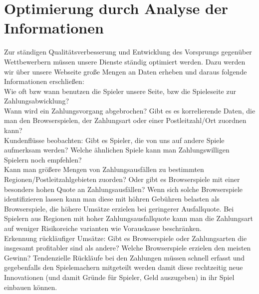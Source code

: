 \documentclass[a4paper,10pt]{article}
\begin{document}
\newpage
\section{Optimierung durch Analyse der Informationen}\label{labelRelDaten}


Zur ständigen Qualitätsverbesserung und Entwicklung des Vorsprungs gegenüber Wettbewerbern müssen unsere Dienste ständig optimiert werden.
Dazu werden wir über unsere Webseite große Mengen an Daten erheben und daraus folgende Informationen erschließen:\\
Wie oft bzw wann benutzen die Spieler unsere Seite, bzw die Spieleseite zur Zahlungsabwicklung?\\
Wann wird ein Zahlungsvorgang abgebrochen? Gibt es es korrelierende Daten, die man den Browserspielen, der Zahlungsart oder einer Postleitzahl/Ort zuordnen kann?\\
Kundenflüsse beobachten: Gibt es Spieler, die von uns auf andere Spiele aufmerksam werden? Welche ähnlichen Spiele kann man Zahlungswilligen Spielern noch empfehlen?\\
Kann man größere Mengen von Zahlungsausfällen zu bestimmten Regionen/Postleitzahlgebieten zuorden? Oder gibt es Browserspiele mit einer besonders hohen Quote an Zahlungsausfällen?
Wenn sich solche Browserspiele identifizieren lassen kann man diese mit höhren Gebühren belasten als Browserspiele, die höhere Umsätze erzielen bei geringerer Ausfallquote.
Bei Spielern aus Regionen mit hoher Zahlungsausfallquote kann man die Zahlungsart auf weniger Risikoreiche varianten wie Vorauskasse beschränken.\\
Erkennung rückläufiger Umsätze: Gibt es Browserspiele oder Zahlungsarten die insgesamt profitabler sind als andere? Welche Browserspiele erzielen den meisten Gewinn?
Tendenzielle Rückläufe bei den Zahlungen müssen schnell erfasst und gegebenfalls den Spielemachern mitgeteilt werden damit diese rechtzeitig neue Innovationen (und damit Gründe für Spieler,
Geld auszugeben) in ihr Spiel einbauen können.
\end{document}
